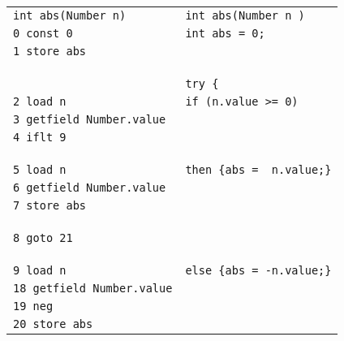   \begin{figure}[ht!]
\begin{frameit}
  \scriptsize{
  \begin{tabular}{ll}
\lstinline!int abs(Number n)!    & \lstinline!int abs(Number n )! \\
				     
\lstinline!0 const 0!                 &  \lstinline!int abs = 0;!\\
\lstinline!1 store abs!		      & \\ 
				      & \\ &\\ &\\
				      & \lstinline!try {!\\
\lstinline!2 load n!                  & \Myspace \lstinline!if (n.value >= 0)!\\
\lstinline!3 getfield Number.value! & \\
\lstinline!4 iflt 9!                  & \\
                                      & \\ &\\ &\\
\lstinline!5 load n!                  & \Myspace\Myspace\lstinline!then {abs =  n.value;}!\\			
\lstinline!6 getfield Number.value! & \\
\lstinline!7 store abs!                 & \\
                                      & \\ &\\ &\\
\lstinline!8 goto 21!		      & \\
                                      & \\ &\\ &\\
\lstinline!9 load n!		      & \Myspace\Myspace\lstinline!else {abs = -n.value;}!\\
\lstinline!18 getfield Number.value!&   \\
\lstinline!19 neg!                    & \\
\lstinline!20 store abs!	      & \\


\end{tabular}}
\end{frameit}
\end{figure}
